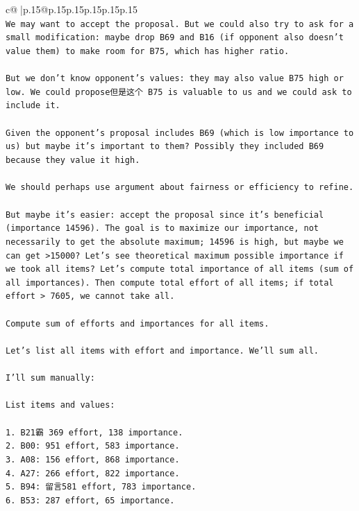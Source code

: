 \documentclass{article}
\begin{document}
{\begin{supertabular}{c@{$\;$}|p{.15\linewidth}@{}p{.15\linewidth}p{.15\linewidth}p{.15\linewidth}p{.15\linewidth}p{.15\linewidth}}
{{{\\ 
\texttt{We may want to accept the proposal. But we could also try to ask for a small modification: maybe drop B69 and B16 (if opponent also doesn't value them) to make room for B75, which has higher ratio.} \\
\\ 
\texttt{But we don't know opponent's values: they may also value B75 high or low. We could propose但是这个 B75 is valuable to us and we could ask to include it.} \\
\\ 
\texttt{Given the opponent's proposal includes B69 (which is low importance to us) but maybe it's important to them? Possibly they included B69 because they value it high.} \\
\\ 
\texttt{We should perhaps use argument about fairness or efficiency to refine.} \\
\\ 
\texttt{But maybe it's easier: accept the proposal since it's beneficial (importance 14596). The goal is to maximize our importance, not necessarily to get the absolute maximum; 14596 is high, but maybe we can get >15000? Let's see theoretical maximum possible importance if we took all items? Let's compute total importance of all items (sum of all importances). Then compute total effort of all items; if total effort > 7605, we cannot take all.} \\
\\ 
\texttt{Compute sum of efforts and importances for all items.} \\
\\ 
\texttt{Let's list all items with effort and importance. We'll sum all.} \\
\\ 
\texttt{I'll sum manually:} \\
\\ 
\texttt{List items and values:} \\
\\ 
\texttt{1. B21霸 369 effort, 138 importance.} \\
\texttt{2. B00: 951 effort, 583 importance.} \\
\texttt{3. A08: 156 effort, 868 importance.} \\
\texttt{4. A27: 266 effort, 822 importance.} \\
\texttt{5. B94: 留言581 effort, 783 importance.} \\
\texttt{6. B53: 287 effort, 65 importance.} \\
}}}
\end{supertabular}}
\end{document}
